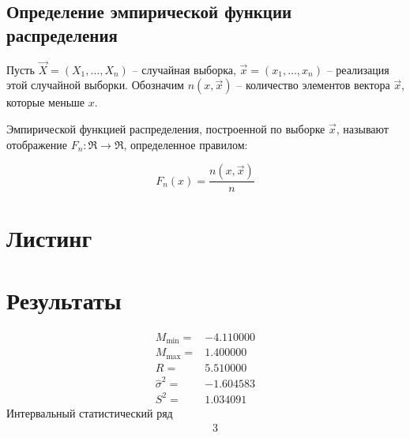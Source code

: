 \documentclass[a4paper,11pt,russian]{extreport}
\begin{document}
	\section{Определение эмпирической функции распределения}
	Пусть $\vec{X}=(X_1, \dots , X_n)$ – случайная выборка, $\vec{x}=(x_1, \dots , x_n)$ – реализация этой случайной выборки. Обозначим $n(x,\vec{x})$ – количество элементов вектора $\vec{x}$, которые меньше $x$.
	
	Эмпирической функцией распределения, построенной по выборке $\vec{x}$, называют отображение $F_n\colon \Re \to \Re$, определенное правилом:
	
	\begin{equation}
	F_n(x) = \frac{n(x, \vec{x})}{n}
	\end{equation}
	
	\chapter{Листинг}
	
	
	\chapter{Результаты}
	\begin{align*}
	M_{\min} =& -4.110000 \\
	M_{\max} =& 1.400000 \\
	R =& 5.510000 \\
	\hat{\sigma}^2 =& -1.604583 \\
	S^2 =& 1.034091
	\end{align*}
	Интервальный статистический ряд \\
	\begin{align*}
	[-4.110000;\ -3.421250)\quad & 4 \\
	[-3.421250;\ -2.732500)\quad & 11 \\
	[-2.732500;\ -2.043750)\quad & 26 \\
	[-2.043750;\ -1.355000)\quad & 33 \\
	[-1.355000;\ -0.666250)\quad & 26 \\
	[-0.666250;\ 0.022500)\quad & 15 \\
	[0.022500;\ 0.711250)\quad & 2 \\
	[0.711250;\ 1.400000]\quad & 3
	\end{align*}
	
\end{document}
